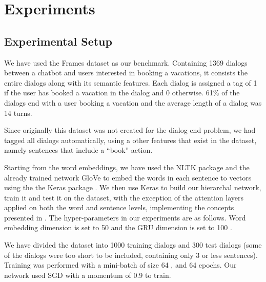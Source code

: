 \section{Experiments}\label{sec:exp}

\subsection{Experimental Setup}
We have used the Frames dataset \cite{frames} as 
our benchmark. Containing 1369 dialogs between 
a chatbot and users interested in booking a vacations, 
it consists the entire dialogs along with its semantic features. 
Each dialog is assigned a tag of 1 if the user has booked a vacation 
in the dialog and 0 otherwise. 61\% of the dialogs end with a user 
booking a vacation and the average length of a dialog was 14 turns. 

Since originally this dataset was not created for the dialog-end problem, 
we had tagged all dialogs automatically, using a other features that exist 
in the dataset, namely sentences that include a ``book'' action. 

Starting from the word embeddings, we have used the 
NLTK package \cite{DBLP:conf/acl/Bird06} and the already trained network GloVe \cite{glove} 
to embed the words in each sentence to vectors using the the Keras package \cite{chollet2015}. 
We then use Keras to build our hierarchal network, train it and test it on the 
dataset, with the exception of the attention layers applied on both the word and sentence 
levels, implementing the concepts presented in \cite{attention,tc}. 
The hyper-parameters in our experiments are as follows. 
Word embedding dimension is set to 50  and the 
GRU dimension is set to 100 . 

We have divided the dataset into 1000 training dialogs and 300 test dialogs 
(some of the dialogs were too short to be included, containing only 3 or less sentences).
Training was performed with a mini-batch of size 64 , 
and 64  epochs.
Our network used SGD with a momentum of 0.9  to train.

